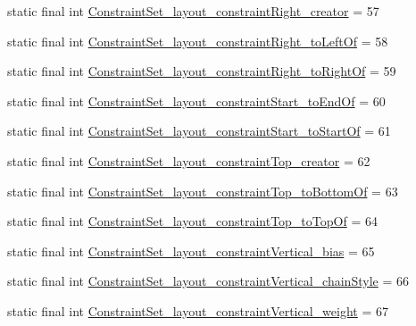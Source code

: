\begin{DoxyCompactItemize}
\item 
static final int \mbox{\hyperlink{classandroid_1_1support_1_1constraint_1_1_r_1_1styleable_ae68c2b9e595bce46a3199cedbb5a627c}{Constraint\+Set\+\_\+layout\+\_\+constraint\+Right\+\_\+creator}} = 57
\item 
static final int \mbox{\hyperlink{classandroid_1_1support_1_1constraint_1_1_r_1_1styleable_a4ae75f8fad6a2842bf5fd68206b712e5}{Constraint\+Set\+\_\+layout\+\_\+constraint\+Right\+\_\+to\+Left\+Of}} = 58
\item 
static final int \mbox{\hyperlink{classandroid_1_1support_1_1constraint_1_1_r_1_1styleable_ab7f2fa472e19d6137d084dafb9c8cf8a}{Constraint\+Set\+\_\+layout\+\_\+constraint\+Right\+\_\+to\+Right\+Of}} = 59
\item 
static final int \mbox{\hyperlink{classandroid_1_1support_1_1constraint_1_1_r_1_1styleable_a86d8562ee92eba764ce7687251cfb4a7}{Constraint\+Set\+\_\+layout\+\_\+constraint\+Start\+\_\+to\+End\+Of}} = 60
\item 
static final int \mbox{\hyperlink{classandroid_1_1support_1_1constraint_1_1_r_1_1styleable_a17b346ad41b698424b95b819f1ec00cd}{Constraint\+Set\+\_\+layout\+\_\+constraint\+Start\+\_\+to\+Start\+Of}} = 61
\item 
static final int \mbox{\hyperlink{classandroid_1_1support_1_1constraint_1_1_r_1_1styleable_ae22ab3cc773fb654231f119f40d97b3a}{Constraint\+Set\+\_\+layout\+\_\+constraint\+Top\+\_\+creator}} = 62
\item 
static final int \mbox{\hyperlink{classandroid_1_1support_1_1constraint_1_1_r_1_1styleable_a27682fc614f33581df18b2fb18ba2c1c}{Constraint\+Set\+\_\+layout\+\_\+constraint\+Top\+\_\+to\+Bottom\+Of}} = 63
\item 
static final int \mbox{\hyperlink{classandroid_1_1support_1_1constraint_1_1_r_1_1styleable_a43c4a550f6e4869061fe1a1de4fd15fb}{Constraint\+Set\+\_\+layout\+\_\+constraint\+Top\+\_\+to\+Top\+Of}} = 64
\item 
static final int \mbox{\hyperlink{classandroid_1_1support_1_1constraint_1_1_r_1_1styleable_a2b3b6f5605f91bc6ae18804805d8a443}{Constraint\+Set\+\_\+layout\+\_\+constraint\+Vertical\+\_\+bias}} = 65
\item 
static final int \mbox{\hyperlink{classandroid_1_1support_1_1constraint_1_1_r_1_1styleable_a53efdba2b381d54d98240ef4c76c2ef4}{Constraint\+Set\+\_\+layout\+\_\+constraint\+Vertical\+\_\+chain\+Style}} = 66
\item 
static final int \mbox{\hyperlink{classandroid_1_1support_1_1constraint_1_1_r_1_1styleable_a8ef0b9dd7e8ebb03f8a891985766f70d}{Constraint\+Set\+\_\+layout\+\_\+constraint\+Vertical\+\_\+weight}} = 67

\end{DoxyCompactItemize}
